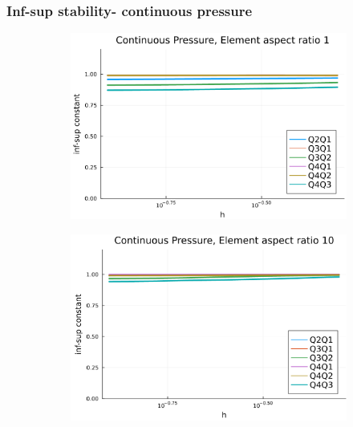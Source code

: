 \documentclass{beamer}
\begin{document}
\begin{frame}
	\frametitle{Inf-sup stability- continuous pressure}

	\begin{figure} [H]
		\begin{subfigure}{.5\textwidth}
			\centering
			\includegraphics[width=.9\textwidth]{../figs/cont-p-1.png}
		\end{subfigure}%
		\begin{subfigure}{.5\textwidth}
			\centering
			\includegraphics[width=.9\textwidth]{../figs/cont-p-10.png}
		\end{subfigure}
	\end{figure}
\end{frame}
\end{document}
